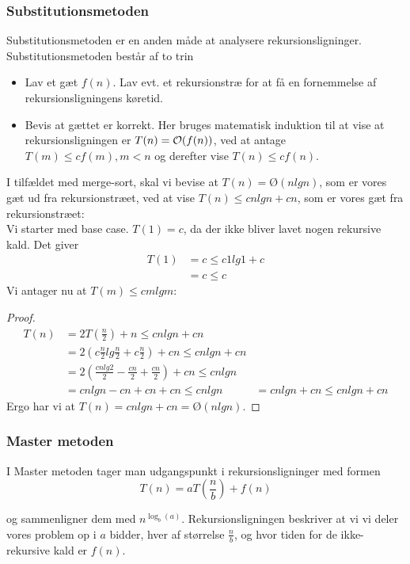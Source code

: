 \subsubsection{Substitutionsmetoden}
Substitutionsmetoden er en anden måde at analysere rekursionsligninger. Substitutionsmetoden består af to trin
\begin{itemize}
\item Lav et gæt $f(n)$. Lav evt. et rekursionstræ for at få en fornemmelse af rekursionsligningens køretid.
\item Bevis at gættet er korrekt. Her bruges matematisk induktion til at vise at rekursionsligningen er $T(n) = \mathcal{O}(f(n))$, ved at antage $T(m) \leq cf(m), m < n$ og derefter vise $T(n) \leq cf(n)$.
\end{itemize}

I tilfældet med merge-sort, skal vi bevise at $T(n) = Ø(nlgn)$, som er vores gæt ud fra rekursionstræet, ved at vise $T(n) \leq cnlgn + cn$, som er vores gæt fra rekursionstræet:\\

Vi starter med base case. $T(1) = c$, da der ikke bliver lavet nogen rekursive kald. Det giver
\begin{align*}
  T(1) &= c \leq c1lg1 + c\\
       &= c \leq c
\end{align*}
Vi antager nu at $T(m) \leq cmlgm$:\\

\begin{proof}
  \begin{align*}
    T(n) &= 2T(\frac{n}{2}) + n \leq cnlgn + cn\\
         &= 2(c\frac{n}{2}lg\frac{n}{2} + c\frac{n}{2}) + cn \leq cnlgn + cn\\
         &= 2(\frac{cnlg2}{2} - \frac{cn}{2} + \frac{cn}{2}) + cn \leq cnlgn\\
         &= cnlgn - cn + cn + cn \leq cnlgn
         &= cnlgn + cn \leq cnlgn + cn
  \end{align*}
  Ergo har vi at $T(n) = cnlgn + cn = Ø(nlgn)$.
\end{proof}

\subsubsection{Master metoden}
I Master metoden tager man udgangspunkt i rekursionsligninger med formen
$$T(n) = aT(\frac{n}{b}) + f(n)$$

og sammenligner dem med $n^{\log_b(a)}$. Rekursionsligningen beskriver at vi vi deler vores problem op i $a$ bidder, hver af størrelse $\frac{n}{b}$, og hvor tiden for de ikke-rekursive kald er $f(n)$.\\

